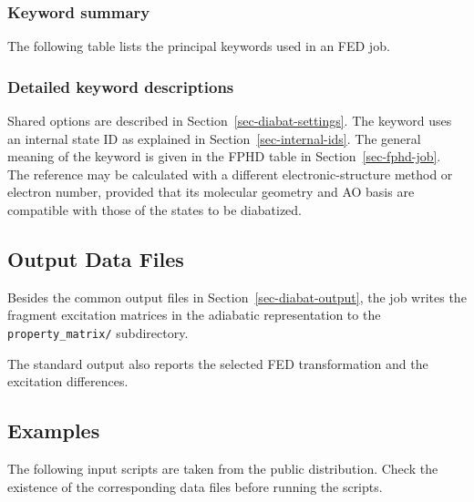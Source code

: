 \subsubsection*{Keyword summary}
The following table lists the principal keywords used in an FED job.
\begin{keywordoverview}
\end{keywordoverview}
\subsubsection*{Detailed keyword descriptions}
Shared options are described in Section~\ref{sec-diabat-settings}. The  keyword uses an internal state ID as explained in Section~\ref{sec-internal-ids}. The general meaning of the keyword is given in the FPHD table in Section~\ref{sec-fphd-job}. The reference may be calculated with a different electronic-structure method or electron number, provided that its molecular geometry and AO basis are compatible with those of the states to be diabatized.
\subsection{Output Data Files}
Besides the common output files in Section~\ref{sec-diabat-output}, the job writes the fragment excitation matrices in the adiabatic representation to the \texttt{property\_matrix/} subdirectory.
\par\vspace{0.55\baselineskip}
The standard output also reports the selected FED transformation and the excitation differences.

\subsection{Examples}
The following input scripts are taken from the public distribution. Check the existence of the corresponding data files before running the scripts.

